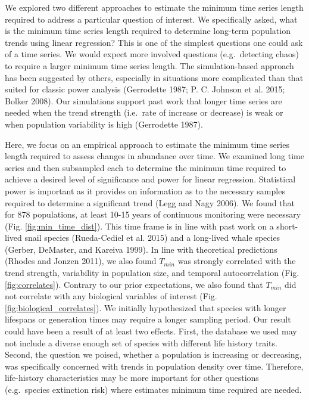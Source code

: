 \documentclass[12pt,]{article}
\begin{document}
We explored two different approaches to estimate the minimum time series
length required to address a particular question of interest. We
specifically asked, what is the minimum time series length required to
determine long-term population trends using linear regression? This is
one of the simplest questions one could ask of a time series. We would
expect more involved questions (e.g.~detecting chaos) to require a
larger minimum time series length. The simulation-based approach has
been suggested by others, especially in situations more complicated than
that suited for classic power analysis (Gerrodette 1987; P. C. Johnson
et al. 2015; Bolker 2008). Our simulations support past work that longer
time series are needed when the trend strength (i.e.~rate of increase or
decrease) is weak or when population variability is high (Gerrodette
1987).

Here, we focus on an empirical approach to estimate the minimum time
series length required to assess changes in abundance over time. We
examined long time series and then subsampled each to determine the
minimum time required to achieve a desired level of significance and
power for linear regression. Statistical power is important as it
provides on information as to the necessary samples required to
determine a significant trend (Legg and Nagy 2006). We found that for
878 populations, at least 10-15 years of continuous monitoring were
necessary (Fig. \ref{fig:min_time_dist}). This time frame is in line
with past work on a short-lived snail species (Rueda-Cediel et al. 2015)
and a long-lived whale species (Gerber, DeMaster, and Kareiva 1999). In
line with theoretical predictions (Rhodes and Jonzen 2011), we also
found \(T_{min}\) was strongly correlated with the trend strength,
variability in population size, and temporal autocorrelation (Fig.
\ref{fig:correlates}). Contrary to our prior expectations, we also found
that \(T_{min}\) did not correlate with any biological variables of
interest (Fig. \ref{fig:biological_correlates}). We initially
hypothesized that species with longer lifespans or generation times may
require a longer sampling period. Our result could have been a result of
at least two effects. First, the database we used may not include a
diverse enough set of species with different life history traits.
Second, the question we poised, whether a population is increasing or
decreasing, was specifically concerned with trends in population density
over time. Therefore, life-history characteristics may be more important
for other questions (e.g.~species extinction risk) where estimates
minimum time required are needed.
\end{document}
